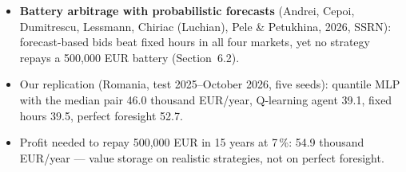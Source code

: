 \begin{itemize}\setlength{\itemsep}{2pt}
  \item \textbf{Battery arbitrage with probabilistic forecasts} (Andrei, Cepoi, Dumitrescu, Lessmann, Chiriac (Luchian), Pele \& Petukhina, 2026, SSRN): forecast-based bids beat fixed hours in all four markets, yet no strategy repays a 500,000 EUR battery (Section~6.2).
  \item Our replication (Romania, test 2025--October 2026, five seeds): quantile MLP with the median pair 46.0 thousand EUR/year, Q-learning agent 39.1, fixed hours 39.5, perfect foresight 52.7.
  \item Profit needed to repay 500,000 EUR in 15 years at 7\,\%: 54.9 thousand EUR/year --- value storage on realistic strategies, not on perfect foresight.
\end{itemize}
